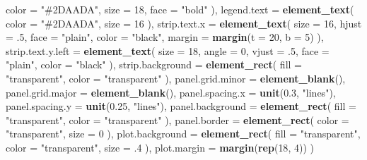 \documentclass[
]{book}
\newenvironment{Shaded}{\begin{snugshade}}{\end{snugshade}}
\newcommand{\AttributeTok}[1]{\textcolor[rgb]{0.13,0.29,0.53}{#1}}
\newcommand{\DecValTok}[1]{\textcolor[rgb]{0.00,0.00,0.81}{#1}}
\newcommand{\FloatTok}[1]{\textcolor[rgb]{0.00,0.00,0.81}{#1}}
\newcommand{\FunctionTok}[1]{\textcolor[rgb]{0.13,0.29,0.53}{\textbf{#1}}}
\newcommand{\NormalTok}[1]{#1}
\newcommand{\StringTok}[1]{\textcolor[rgb]{0.31,0.60,0.02}{#1}}
\begin{document}
\begin{Shaded}
\begin{Highlighting}[]
      \AttributeTok{color =} \StringTok{"\#2DAADA"}\NormalTok{,}
      \AttributeTok{size =} \DecValTok{18}\NormalTok{,}
      \AttributeTok{face =} \StringTok{"bold"}
\NormalTok{    ),}
    \AttributeTok{legend.text =} \FunctionTok{element\_text}\NormalTok{(}
      \AttributeTok{color =} \StringTok{"\#2DAADA"}\NormalTok{,}
      \AttributeTok{size =} \DecValTok{16}
\NormalTok{    ),}
    \AttributeTok{strip.text.x =} \FunctionTok{element\_text}\NormalTok{(}
      \AttributeTok{size =} \DecValTok{16}\NormalTok{,}
      \AttributeTok{hjust =}\NormalTok{ .}\DecValTok{5}\NormalTok{,}
      \AttributeTok{face =} \StringTok{"plain"}\NormalTok{,}
      \AttributeTok{color =} \StringTok{"black"}\NormalTok{,}
      \AttributeTok{margin =} \FunctionTok{margin}\NormalTok{(}\AttributeTok{t =} \DecValTok{20}\NormalTok{, }\AttributeTok{b =} \DecValTok{5}\NormalTok{)}
\NormalTok{    ),}
    \AttributeTok{strip.text.y.left =} \FunctionTok{element\_text}\NormalTok{(}
      \AttributeTok{size =} \DecValTok{18}\NormalTok{,}
      \AttributeTok{angle =} \DecValTok{0}\NormalTok{,}
      \AttributeTok{vjust =}\NormalTok{ .}\DecValTok{5}\NormalTok{,}
      \AttributeTok{face =} \StringTok{"plain"}\NormalTok{,}
      \AttributeTok{color =} \StringTok{"black"}
\NormalTok{    ),}
    \AttributeTok{strip.background =} \FunctionTok{element\_rect}\NormalTok{(}
      \AttributeTok{fill =} \StringTok{"transparent"}\NormalTok{,}
      \AttributeTok{color =} \StringTok{"transparent"}
\NormalTok{    ),}
    \AttributeTok{panel.grid.minor =} \FunctionTok{element\_blank}\NormalTok{(),}
    \AttributeTok{panel.grid.major =} \FunctionTok{element\_blank}\NormalTok{(),}
    \AttributeTok{panel.spacing.x =} \FunctionTok{unit}\NormalTok{(}\FloatTok{0.3}\NormalTok{, }\StringTok{"lines"}\NormalTok{),}
    \AttributeTok{panel.spacing.y =} \FunctionTok{unit}\NormalTok{(}\FloatTok{0.25}\NormalTok{, }\StringTok{"lines"}\NormalTok{),}
    \AttributeTok{panel.background =} \FunctionTok{element\_rect}\NormalTok{(}
      \AttributeTok{fill =} \StringTok{"transparent"}\NormalTok{,}
      \AttributeTok{color =} \StringTok{"transparent"}
\NormalTok{    ),}
    \AttributeTok{panel.border =} \FunctionTok{element\_rect}\NormalTok{(}
      \AttributeTok{color =} \StringTok{"transparent"}\NormalTok{,}
      \AttributeTok{size =} \DecValTok{0}
\NormalTok{    ),}
    \AttributeTok{plot.background =} \FunctionTok{element\_rect}\NormalTok{(}
      \AttributeTok{fill =} \StringTok{"transparent"}\NormalTok{,}
      \AttributeTok{color =} \StringTok{"transparent"}\NormalTok{,}
      \AttributeTok{size =}\NormalTok{ .}\DecValTok{4}
\NormalTok{    ),}
    \AttributeTok{plot.margin =} \FunctionTok{margin}\NormalTok{(}\FunctionTok{rep}\NormalTok{(}\DecValTok{18}\NormalTok{, }\DecValTok{4}\NormalTok{))}
\NormalTok{  )}
\end{Highlighting}
\end{Shaded}
\end{document}
